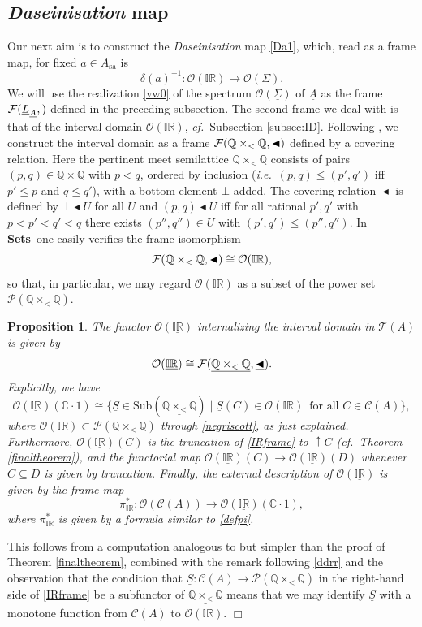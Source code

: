 \documentclass[11pt]{article}
\newcommand{\IR}{\mathbb{IR}}
\newcommand{\Q}{\mathbb{Q}}
\newcommand{\uIR}{\underline{\mathbb{IR}}}
\newcommand{\drie}{\vartriangleleft}
\newcommand{\coveredd}{\ensuremath{\mathop{\blacktriangleleft}}}
\newcommand{\beq}{\begin{equation}}
\newcommand{\eeq}{\end{equation}}
\newcommand{\Sets}{\mbox{\textbf{Sets}}}
\newcommand{\raw}{\rightarrow} \newcommand{\rat}{\mapsto}
\newcommand{\x}{\times} \newcommand{\hb}{\hbar}
\newcommand{\inv}{^{-1}}
\newcommand{\er}{\eqref}
\newcommand{\dl}{\delta} \newcommand{\Dl}{\Delta}
\newcommand{\CA}{{\mathcal A}} \newcommand{\CB}{{\mathcal B}}
\newcommand{\CO}{{\mathcal O}} \newcommand{\CP}{{\mathcal P}}
\newcommand{\C}{{\mathbb C}} \newcommand{\D}{{\mathbb D}}
\newcommand{\alg}[1]{\ensuremath{#1}}
\newcommand{\functor}[1]{\ensuremath{\underline{#1}}}
\newcommand{\context}{\ensuremath{\mathcal{C}}}
\newcommand{\asstopos}{\ensuremath{\mathcal{T}}}
\newcommand{\sa}{\ensuremath{_{\mathrm{sa}}}}
\newcommand{\uA}{\underline{A}}
\renewcommand{\CA}{\mathcal{C}(A)}
\newcommand{\TA}{\mathcal{T}(A)}
\newcommand{\ie}{\textit{i.e.}}
\newcommand{\ulS}{\functor{\Sigma}}
\renewcommand{\TA}{\asstopos(\alg{A})}
\renewcommand{\CA}{\context(\alg{A})}
\newtheorem{proposition}[theorem]{Proposition}
\newenvironment{proof}[1][Proof]%
{ \begin{trivlist}%
  \item[\hskip \labelsep {\bfseries #1}]%
}%
{ \end{trivlist}%
}
\newcommand{\qed}{\nobreak\hfill$\Box$}
\begin{document}
\subsection{\emph{Daseinisation} map}
\label{AppA:Das}
Our next aim is to construct the {\it Daseinisation} map \er{Da1}, which, read as a frame map,
for fixed $a\in A\sa$ is
\beq
\underline{\dl}(a)\inv:  \CO(\underline{\IR}) \raw \CO(\ulS).\label{Da2}\eeq
We will  use the realization \er{vw0} of the spectrum $\CO(\ulS)$ of $\uA$
as the frame $\CF(\underline{L}_{\uA},\underline{\drie})$ defined in the preceding subsection.
The second frame we deal with is that of the interval domain $\CO(\IR)$, {\it cf.}\ Subsection \ref{subsec:ID}. Following \cite{negri}, we construct the
 interval domain as a frame $\CF(\Q\x_{<}\Q,\coveredd)$ defined by a
 covering relation.
  Here the pertinent meet semilattice $\Q\x_{<}\Q$
 consists  of pairs $(p,q)\in\Q\x\Q$ with $p<q$, ordered by inclusion
 (\ie\ $(p,q)\leqslant (p',q')$ iff $p'\leqslant p$ and $q\leqslant q'$), with a bottom element $\bot$ added.
  The
 covering relation $\coveredd$ is defined by $\bot \coveredd U$ for all $U$ and
$(p,q) \coveredd U$ iff for all rational $p',q'$ with $p<p'<q'<q$ there exists $(p'',q'')\in U$ with
 $(p',q') \leqslant (p'',q'')$.
In \Sets\ one easily verifies the frame isomorphism
\beq \CF(\Q\x_{<}\Q,\coveredd)\cong\CO(\IR),\label{negriscott}\eeq
so that, in particular, we may regard $\CO(\IR)$ as a subset of the power set $\CP(\Q\x_{<}\Q)$.
\begin{proposition}\label{IRext}
The functor $\CO(\uIR)$ internalizing the interval domain in $\TA$ is given by
\beq
\CO(\uIR) \cong \CF(\underline{\Q\x_{<}\Q},\underline{\coveredd}).
  \label{negriscott2}
\eeq
Explicitly, we have
\beq \CO(\uIR)(\C\cdot 1)\cong \{\underline{S}\in\mathrm{Sub}(\underline{\Q\x_{<}\Q})\mid
  \underline{S}(C)\in \CO(\IR)\, \mbox{ for all } C\in\CA\},\label{IRframe}
  \eeq
where $\CO(\IR)\subset \CP(\Q\x_{<}\Q)$ through \er{negriscott}, as just explained. 
 Furthermore, $\CO(\uIR)(C)$ is the truncation of \er{IRframe} to $\uparrow\! C$ (cf.\ Theorem \ref{finaltheorem}), and the functorial map
 $\CO(\uIR)(C)\raw \CO(\uIR)(D)$ whenever $C\subseteq D$ is given by truncation.
Finally, the external description of $\CO(\uIR)$ is given by the frame map 
\beq
 \pi_{\IR}^*:\CO(\CA)\raw \CO(\uIR)(\C\cdot 1), \label{JTmaps}
 \eeq
where $\pi_{\IR}^*$ is given by a  formula similar to \er{defpi}.
\end{proposition}
\begin{proof}
This follows from a computation analogous to but simpler than the proof of 
Theorem \ref{finaltheorem}, combined with the remark following \er{ddrr}
and the observation that the condition that $\underline{S}:\CA\raw\CP(\Q\x_{<}\Q)$ 
in the right-hand side of \er{IRframe} be a subfunctor of  $\underline{\Q\x_{<}\Q}$ means that we may identify $\underline{S}$ with a monotone function from $\CA$ to $\CO(\IR)$. \qed
\end{proof}
\end{document}
